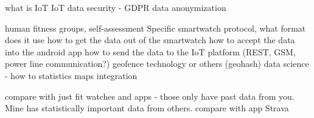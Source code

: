 what is IoT
IoT data security - GDPR
data anonymization

human fitness groups, self-assessment
Specific smartwatch protocol, what format does it use
how to get the data out of the smartwatch
how to accept the data into the android app
how to send the data to the IoT platform (REST, GSM, power line communication?)
geofence technology or others (geohash)
data science - how to statistics
maps integration

compare with just fit watches and apps - those only have past data from you. Mine has statistically important data from others.
compare with app Strava
